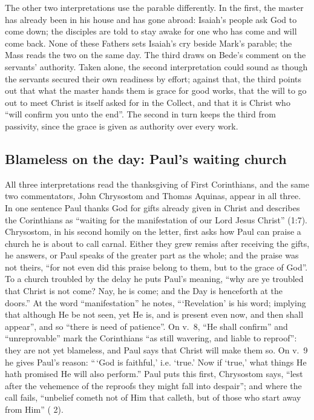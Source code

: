 The other two interpretations use the parable differently. In the first,
the master has already been in his house and has gone abroad: Isaiah's people
ask God to come down; the disciples are told to stay awake for one who has
come and will come back. None of these Fathers sets Isaiah's cry beside
Mark's parable; the Mass reads the two on the same day. The
third draws on Bede's comment on the servants' authority. Taken alone, the
second interpretation could sound as though the servants secured their own
readiness by effort; against that, the third points out that what the master
hands them is
grace for good works, that the will to go out to meet Christ is itself asked
for in the Collect, and that it is Christ who ``will confirm you unto the
end''. The second in turn keeps the third from passivity, since the grace is
given as authority over every work.

\subsection{Blameless on the day: Paul's waiting church}

All three interpretations read the thanksgiving of First Corinthians, and the
same two commentators, John Chrysostom and Thomas Aquinas, appear in all
three. In one
sentence Paul thanks God for gifts already given in Christ and describes the
Corinthians as ``waiting for the manifestation of our Lord Jesus Christ''
(1:7). Chrysostom, in his second homily on the letter, first asks how Paul
can praise a church he is about to call carnal. Either they grew remiss after
receiving the gifts, he answers, or Paul speaks of the greater part as the
whole; and the praise was not theirs, ``for not even did this praise belong to
them, but to the grace of God''. To a church troubled by the delay he puts
Paul's meaning, ``why are ye troubled that Christ is not come? Nay, he is
come; and the Day is henceforth at the doors.'' At the word ``manifestation''
he notes, ```Revelation' is his word; implying that although He be not seen,
yet He is, and is present even now, and then shall appear'', and so ``there is
need of patience''. On v.~8, ``He shall confirm'' and
``unreprovable'' mark the Corinthians ``as still wavering, and liable to
reproof'': they are not yet blameless, and Paul says that Christ will make them
so. On v.~9 he gives Paul's reason: ``\,`God is faithful,' i.e. `true.' Now if
`true,' what things He hath promised He will also perform.'' Paul puts this
first, Chrysostom says, ``lest after the vehemence of the reproofs they might
fall into despair''; and where the call fails, ``unbelief cometh not of Him
that calleth, but of those who start away from Him'' ( 2).

